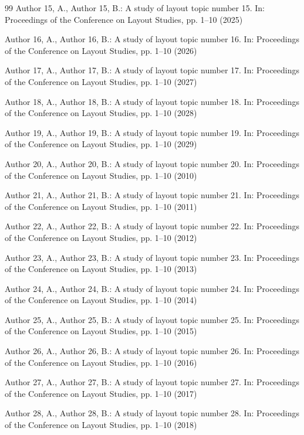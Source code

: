 \documentclass[10pt,letterpaper]{article}
\begin{document}
\begin{thebibliography}{99}
 Author 15, A., Author 15, B.: A study of layout topic number 15. In: Proceedings of the Conference on Layout Studies, pp. 1--10 (2025)

 Author 16, A., Author 16, B.: A study of layout topic number 16. In: Proceedings of the Conference on Layout Studies, pp. 1--10 (2026)

 Author 17, A., Author 17, B.: A study of layout topic number 17. In: Proceedings of the Conference on Layout Studies, pp. 1--10 (2027)

 Author 18, A., Author 18, B.: A study of layout topic number 18. In: Proceedings of the Conference on Layout Studies, pp. 1--10 (2028)

 Author 19, A., Author 19, B.: A study of layout topic number 19. In: Proceedings of the Conference on Layout Studies, pp. 1--10 (2029)

 Author 20, A., Author 20, B.: A study of layout topic number 20. In: Proceedings of the Conference on Layout Studies, pp. 1--10 (2010)

 Author 21, A., Author 21, B.: A study of layout topic number 21. In: Proceedings of the Conference on Layout Studies, pp. 1--10 (2011)

 Author 22, A., Author 22, B.: A study of layout topic number 22. In: Proceedings of the Conference on Layout Studies, pp. 1--10 (2012)

 Author 23, A., Author 23, B.: A study of layout topic number 23. In: Proceedings of the Conference on Layout Studies, pp. 1--10 (2013)

 Author 24, A., Author 24, B.: A study of layout topic number 24. In: Proceedings of the Conference on Layout Studies, pp. 1--10 (2014)

 Author 25, A., Author 25, B.: A study of layout topic number 25. In: Proceedings of the Conference on Layout Studies, pp. 1--10 (2015)

 Author 26, A., Author 26, B.: A study of layout topic number 26. In: Proceedings of the Conference on Layout Studies, pp. 1--10 (2016)

 Author 27, A., Author 27, B.: A study of layout topic number 27. In: Proceedings of the Conference on Layout Studies, pp. 1--10 (2017)

 Author 28, A., Author 28, B.: A study of layout topic number 28. In: Proceedings of the Conference on Layout Studies, pp. 1--10 (2018)


\end{thebibliography}
\end{document}
